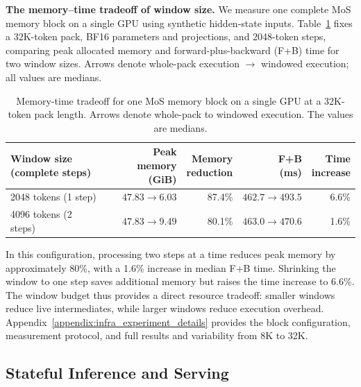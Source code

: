 \textbf{The memory--time tradeoff of window size.} We measure one complete MoS memory block on a single GPU using synthetic hidden-state inputs.
Table~\ref{tab:infra_window_tradeoff} fixes a 32K-token pack, BF16 parameters and projections, and 2048-token steps, comparing peak allocated memory and forward-plus-backward (F+B) time for two window sizes.
Arrows denote whole-pack execution $\rightarrow$ windowed execution; all values are medians.

\begin{table}[htbp]
    \centering
    \caption{Memory-time tradeoff for one MoS memory block on a single GPU at a 32K-token pack length.
    Arrows denote whole-pack to windowed execution. The values are medians.}
    \label{tab:infra_window_tradeoff}
    \small
    \setlength{\tabcolsep}{5pt}
    \renewcommand{\arraystretch}{1.15}
    \begin{tabular}{lrrrr}
        \toprule
        \makecell[l]{Window size\\(complete steps)} & \makecell{Peak memory\\(GiB)} & \makecell{Memory\\reduction} & \makecell{F+B\\(ms)} & \makecell{Time\\increase} \\
        \midrule
        2048 tokens (1 step) & $47.83 \rightarrow 6.03$ & 87.4\% & $462.7 \rightarrow 493.5$ & 6.6\% \\
        4096 tokens (2 steps) & $47.83 \rightarrow 9.49$ & 80.1\% & $463.0 \rightarrow 470.6$ & 1.6\% \\
        \bottomrule
    \end{tabular}
\end{table}

In this configuration, processing two steps at a time reduces peak memory by approximately 80\%, with a 1.6\% increase in median F+B time.
Shrinking the window to one step saves additional memory but raises the time increase to 6.6\%.
The window budget thus provides a direct resource tradeoff: smaller windows reduce live intermediates, while larger windows reduce execution overhead.
Appendix~\ref{appendix:infra_experiment_details} provides the block configuration, measurement protocol, and full results and variability from 8K to 32K.


\subsection{Stateful Inference and Serving}
\label{sec:infra_serving}

